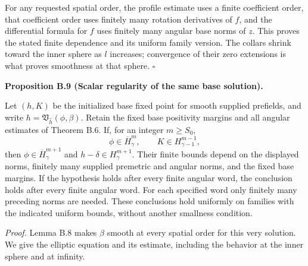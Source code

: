 \documentclass[
  english,
  11pt,
  reqno]{amsart}
\makeatletter
\newcommand{\pandocstatementheading}[1]{%
  \par\if@nobreak\else
    \addpenalty{\@beginparpenalty}%
    \addvspace{.5\baselineskip plus .2\baselineskip minus .2\baselineskip}%
  \fi
  {\normalfont\bfseries #1\par}%
  \nobreak\@afterindenttrue\@afterheading
}
\makeatother
\begin{document}
For any requested spatial order, the profile estimate uses a finite
coefficient order, that coefficient order uses finitely many rotation
derivatives of \(f\), and the differential formula for \(f\) uses
finitely many angular base norms of \(z\). This proves the stated finite
dependence and its uniform family version. The collars shrink toward the
inner sphere as \(l\) increases; convergence of their zero extensions is
what proves smoothness at that sphere. \hfill\(\square\)

\pandocstatementheading{\leavevmode{}\label{prop:online-extension-scalar-one-derivative-gain}Proposition B.9 (Scalar regularity of the same base solution).}

Let \((h,K)\) be the initialized base fixed point for smooth supplied
prefields, and write \(h=\mathfrak V_{\widehat h}(\phi,\beta)\). Retain
the fixed base positivity margins and all angular estimates of Theorem
B.6. If, for an integer \(m\ge S_0\),%
\[
\phi\in\overline H^m_\gamma,
\qquad K\in H^{m-1}_{\gamma-1},
\] then \(\phi\in\overline H^{m+1}_\gamma\) and
\(h-\delta\in H^{m+1}_\gamma\). Their finite bounds depend on the
displayed norms, finitely many supplied premetric and angular norms, and
the fixed base margins. If the hypothesis holds after every finite
angular word, the conclusion holds after every finite angular word. For
each specified word only finitely many preceding norms are needed. These
conclusions hold uniformly on families with the indicated uniform
bounds, without another smallness condition.

\emph{Proof.} Lemma B.8 makes \(\beta\) smooth at every spatial order
for this very solution. We give the elliptic equation and its estimate,
including the behavior at the inner sphere and at infinity.
\end{document}
